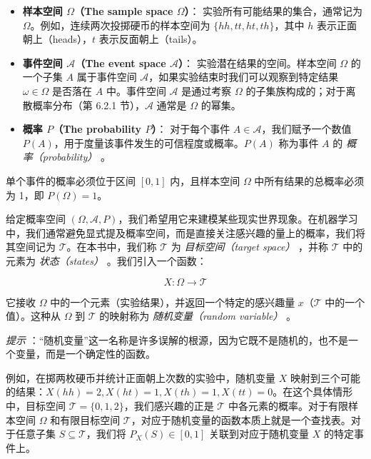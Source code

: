 \begin{itemize}
\item \textbf{样本空间 $ \Omega $（The sample space $ \Omega $）}： 实验所有可能结果的集合，通常记为 $ \Omega $。例如，连续两次投掷硬币的样本空间为 $ \{hh, tt, ht, th\} $，其中 $ h $ 表示正面朝上（heads），$ t $ 表示反面朝上（tails）。
\item \textbf{事件空间 $ \mathcal{A} $（The event space $ \mathcal{A} $）}： 实验潜在结果的空间。样本空间 $ \Omega $ 的一个子集 $ A $ 属于事件空间 $ \mathcal{A} $，如果实验结束时我们可以观察到特定结果 $ \omega \in \Omega $ 是否落在 $ A $ 中。事件空间 $ \mathcal{A} $ 是通过考察 $ \Omega $ 的子集族构成的；对于离散概率分布（第 6.2.1 节），$ \mathcal{A} $ 通常是 $ \Omega $ 的幂集。
\item \textbf{概率 $ P $（The probability $ P $）}： 对于每个事件 $ A \in \mathcal{A} $，我们赋予一个数值 $ P(A) $，用于度量该事件发生的可信程度或概率。$ P(A) $ 称为事件 $ A $ 的 \emph{概率（probability）} 。
\end{itemize}

单个事件的概率必须位于区间 $ [0, 1] $ 内，且样本空间 $ \Omega $ 中所有结果的总概率必须为 1，即 $ P(\Omega) = 1 $。

给定概率空间 $ (\Omega, \mathcal{A}, P) $，我们希望用它来建模某些现实世界现象。在机器学习中，我们通常避免显式提及概率空间，而是直接关注感兴趣的量上的概率，我们将其空间记为 $ \mathcal{T} $。在本书中，我们称 $ \mathcal{T} $ 为 \emph{目标空间（target space）} ，并称 $ \mathcal{T} $ 中的元素为 \emph{状态（states）} 。我们引入一个函数：

\begin{equation*}
X : \Omega \to \mathcal{T}
\end{equation*}

它接收 $ \Omega $ 中的一个元素（实验结果），并返回一个特定的感兴趣量 $ x $（$ \mathcal{T} $ 中的一个值）。这种从 $ \Omega $ 到 $ \mathcal{T} $ 的映射称为 \emph{随机变量（random variable）} 。

\emph{提示} ：“随机变量”这一名称是许多误解的根源，因为它既不是随机的，也不是一个变量，而是一个确定性的函数。

例如，在掷两枚硬币并统计正面朝上次数的实验中，随机变量 $ X $ 映射到三个可能的结果：$ X(hh) = 2, X(ht) = 1, X(th) = 1, X(tt) = 0 $。在这个具体情形中，目标空间 $ \mathcal{T} = \{0, 1, 2\} $，我们感兴趣的正是 $ \mathcal{T} $ 中各元素的概率。对于有限样本空间 $ \Omega $ 和有限目标空间 $ \mathcal{T} $，对应于随机变量的函数本质上就是一个查找表。对于任意子集 $ S \subseteq \mathcal{T} $，我们将 $ P_X(S) \in [0, 1] $ 关联到对应于随机变量 $ X $ 的特定事件上。

